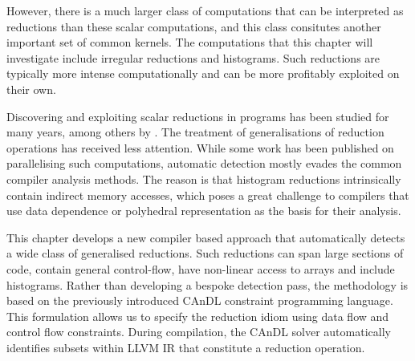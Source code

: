    However, there is a much larger class of computations that can be
    interpreted as reductions than these scalar computations, and this class
    consitutes another important set of common kernels.
    The computations that this chapter will investigate include irregular
    reductions and histograms.
    Such reductions are typically more intense computationally and can be
    more profitably exploited on their own.

    Discovering and exploiting scalar reductions in programs has been
    studied for many years, among others by \citet{pottenger1995idiom}.
    The treatment of generalisations of reduction operations has received less
    attention.
    While some work has been published on parallelising such computations,
    automatic detection mostly evades the common compiler analysis methods.
    The reason is that histogram reductions intrinsically contain indirect
    memory accesses, which poses a great challenge to compilers that use
    data dependence \citep{kuck1981dependence} or polyhedral
    representation \citep{benabderrahmane2010polyhedral} as the basis for
    their analysis.

%
    This chapter develops a new compiler based approach that automatically
    detects a wide class of generalised reductions.
    Such reductions can span large sections of code, contain general
    control-flow, have non-linear access to arrays and include histograms.
    Rather than developing a bespoke detection pass, the methodology is based on
    the previously introduced CAnDL constraint programming language.
    This formulation allows us to specify the reduction idiom using data flow
    and control flow constraints.
    During compilation, the CAnDL solver automatically identifies
    subsets within LLVM IR that constitute a reduction operation.

